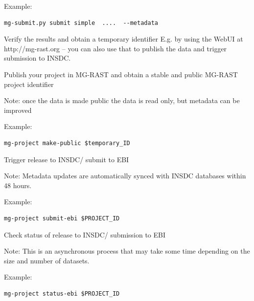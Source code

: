 \documentclass[12pt,fullpage]{report}
\begin{document}
Example:
\begin{lstlisting}
mg-submit.py submit simple  ....  --metadata
\end{lstlisting}
Verify the results and obtain a temporary identifier E.g. by using the WebUI at http://mg-rast.org -- you can also use that to publish the data and trigger submission to INSDC.

Publish your project in MG-RAST and obtain a stable and public MG-RAST project identifier

Note: once the data is made public the data is read only, but metadata can be improved

Example:
\begin{lstlisting}
mg-project make-public $temporary_ID
\end{lstlisting}
Trigger release to INSDC/ submit to EBI

Note: Metadata updates are automatically synced with INSDC databases within 48 hours.

Example:
\begin{lstlisting}
mg-project submit-ebi $PROJECT_ID
\end{lstlisting}
Check status of release to INSDC/ submission to EBI

Note: This is an asynchronous process that may take some time depending on the size and number of datasets.


Example:
\begin{lstlisting}
mg-project status-ebi $PROJECT_ID
\end{lstlisting}
\end{document}
